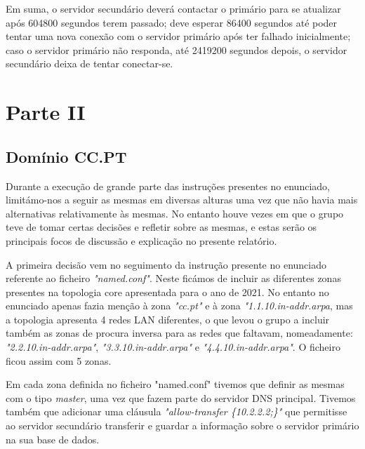 \documentclass[11pt]{article}
\begin{document}
\par Em suma, o servidor secundário deverá contactar o primário para se atualizar após 604800 segundos terem passado; deve esperar 86400 segundos até poder tentar uma nova conexão com o servidor primário após ter falhado inicialmente; caso o servidor primário não responda, até 2419200 segundos depois, o servidor secundário deixa de tentar conectar-se.



\cleardoublepage
\section{Parte II}

\subsection{Domínio CC.PT}

\par Durante a execução de grande parte das instruções presentes no enunciado, limitámo-nos a seguir as mesmas em diversas alturas uma vez que não havia mais alternativas relativamente às mesmas. No entanto houve vezes em que o grupo teve de tomar certas decisões e refletir sobre as mesmas, e estas serão os principais focos de discussão e explicação no presente relatório.

\par A primeira decisão vem no seguimento da instrução presente no enunciado referente ao ficheiro \textit{"named.conf"}. Neste ficámos de incluir as diferentes zonas presentes na topologia core apresentada para o ano de 2021. No entanto no enunciado apenas fazia menção à zona \textit{"cc.pt"} e à zona \textit{"1.1.10.in-addr.arpa}, mas a topologia apresenta 4 redes LAN diferentes, o que levou o grupo a incluir também as zonas de procura inversa para as redes que faltavam, nomeadamente: \textit{"2.2.10.in-addr.arpa"}, \textit{"3.3.10.in-addr.arpa"} e \textit{"4.4.10.in-addr.arpa"}.
\quad O ficheiro ficou assim com 5 zonas.

\par Em cada zona definida no ficheiro "named.conf" tivemos que definir as mesmas com o tipo \textit{master}, uma vez que fazem parte do servidor DNS principal. Tivemos também que adicionar uma cláusula \textit{"allow-transfer \{10.2.2.2;\}"} que permitisse ao servidor secundário transferir e guardar a informação sobre o servidor primário na sua base de dados.
\end{document}
